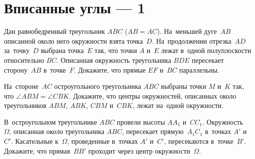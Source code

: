 
\section*{Вписанные углы --- 1}


\begin{problems}

\item
Дан равнобедренный треугольник $ABC$ ($AB = AC$).
На~меньшей дуге~$AB$ описанной около него окружности взята точка~$D$.
На~продолжении отрезка~$AD$ за~точку~$D$ выбрана точка~$E$ так,
что точки $A$ и~$E$ лежат в~одной полуплоскости относительно $BC$.
Описанная окружность треугольника $BDE$ пересекает сторону~$AB$ в~точке~$F$.
Докажите, что прямые $EF$ и~$BC$ параллельны.


\item
На~стороне~$AC$ остроугольного треугольника $ABC$ выбраны точки $M$ и~$K$ так,
что $\angle ABM = \angle CBK$.
Докажите, что центры окружностей, описанных около треугольников $ABM$, $ABK$,
$CBM$ и~$CBK$, лежат на~одной окружности.


\item
В~остроугольном треугольнике $ABC$ провели высоты $A A_1$ и~$C C_1$.
Окружность~$\Omega$, описанная около треугольника $ABC$, пересекает
прямую~$A_1 C_1$ в~точках $A'$ и~$C'$.
Касательные к~$\Omega$, проведенные в~точках $A'$ и~$C'$, пересекаются
в~точке~$B'$.
Докажите, что прямая~$BB'$ проходит через центр окружности~$\Omega$.



\end{problems}
